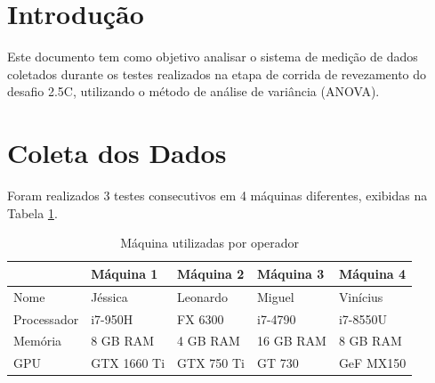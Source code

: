 \documentclass[
12pt,					%
openright,				%
oneside,				%
a4paper,				%
english,
brazil
]{ABNT/abntex2_report}
\begin{document}
	\setlength\beforechapskip{-24pt}
	\setlength\afterchapskip{12pt}
	\textual
	\pagestyle{plain}
	\normalsize
	\justify
	\normalfont


\section*{Introdução}

Este documento tem como objetivo analisar o sistema de medição de dados coletados durante os testes
realizados na etapa de corrida de revezamento do desafio 2.5C, utilizando o método de análise de variância
(ANOVA).

\section*{Coleta dos Dados}
Foram realizados 3 testes consecutivos em 4 máquinas diferentes, exibidas na Tabela \ref{tab:maquinas}.

\begin{table}[H]
	\centering
	\caption{Máquina utilizadas por operador}
	\begin{tabular}{lllll}
	\hline
				& Máquina 1   & Máquina 2  & Máquina 3 & Máquina 4 \\ \hline
	Nome        & Jéssica     & Leonardo   & Miguel    & Vinícius  \\
	Processador & i7-950H     & FX 6300    & i7-4790   & i7-8550U  \\
	Memória     & 8 GB RAM    & 4 GB RAM   & 16 GB RAM & 8 GB RAM  \\
	GPU         & GTX 1660 Ti & GTX 750 Ti & GT 730    & GeF MX150 \\ \hline
	\end{tabular}
	\label{tab:maquinas}
\end{table}
\end{document}
